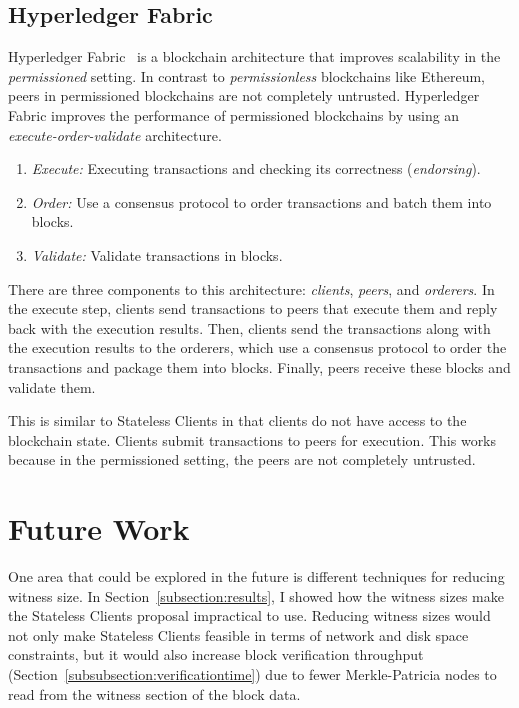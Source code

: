 \documentclass[12pt]{article}
\newcounter{protocol}
\newcommand{\System}{Stateless Clients\xspace}
\begin{document}
\subsection{Hyperledger Fabric}

Hyperledger Fabric~\cite{androulaki2018hyperledger} is a blockchain architecture that improves scalability in the \emph{permissioned} setting. In contrast to \emph{permissionless} blockchains like Ethereum, peers in permissioned blockchains are not completely untrusted. Hyperledger Fabric improves the performance of permissioned blockchains by using an \emph{execute-order-validate} architecture.
\begin{enumerate}
  \item \emph{Execute:} Executing transactions and checking its correctness (\emph{endorsing}).
  \item \emph{Order:} Use a consensus protocol to order transactions and batch them into blocks.
  \item \emph{Validate:} Validate transactions in blocks.
\end{enumerate}

There are three components to this architecture: \emph{clients}, \emph{peers}, and \emph{orderers}. In the execute step, clients send transactions to peers that execute them and reply back with the execution results. Then, clients send the transactions along with the execution results to the orderers, which use a consensus protocol to order the transactions and package them into blocks. Finally, peers receive these blocks and validate them.

This is similar to \System in that clients do not have access to the blockchain state. Clients submit transactions to peers for execution. This works because in the permissioned setting, the peers are not completely untrusted.

\section{Future Work}

One area that could be explored in the future is different techniques for reducing witness size. In Section~\ref{subsection:results}, I showed how the witness sizes make the \System proposal impractical to use. Reducing witness sizes would not only make \System feasible in terms of network and disk space constraints, but it would also increase block verification throughput (Section~\ref{subsubsection:verificationtime}) due to fewer Merkle-Patricia nodes to read from the witness section of the block data.
\end{document}

